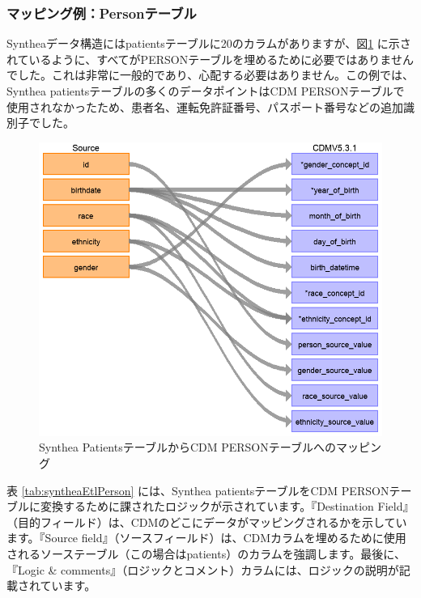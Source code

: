 \documentclass[
  11pt]{book}
\theoremstyle{definition}
\theoremstyle{definition}
\theoremstyle{definition}
\theoremstyle{definition}
\theoremstyle{remark}
\begin{document}
\subsubsection*{マッピング例：Personテーブル}\label{ux30deux30c3ux30d4ux30f3ux30b0ux4f8bpersonux30c6ux30fcux30d6ux30eb}

Syntheaデータ構造にはpatientsテーブルに20のカラムがありますが、図\ref{fig:syntheaPerson} に示されているように、すべてがPERSONテーブルを埋めるために必要ではありませんでした。これは非常に一般的であり、心配する必要はありません。この例では、Synthea patientsテーブルの多くのデータポイントはCDM PERSONテーブルで使用されなかったため、患者名、運転免許証番号、パスポート番号などの追加識別子でした。

\begin{figure}

{\centering \includegraphics[width=1\linewidth]{images/ExtractTransformLoad/syntheaPersonTable} 

}

\caption{Synthea PatientsテーブルからCDM PERSONテーブルへのマッピング}\label{fig:syntheaPerson}
\end{figure}

表 \ref{tab:syntheaEtlPerson} には、Synthea patientsテーブルをCDM PERSONテーブルに変換するために課されたロジックが示されています。『Destination Field』（目的フィールド）は、CDMのどこにデータがマッピングされるかを示しています。『Source field』（ソースフィールド）は、CDMカラムを埋めるために使用されるソーステーブル（この場合はpatients）のカラムを強調します。最後に、『Logic \& comments』（ロジックとコメント）カラムには、ロジックの説明が記載されています。
\end{document}

